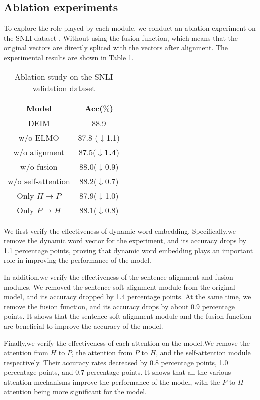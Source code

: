 \documentclass[review]{elsarticle}
\begin{document}
\subsection{ Ablation experiments}
To explore the role played by each module, we conduct an ablation experiment  on the SNLI dataset . Without using the fusion function, which means that the original vectors are directly spliced with the vectors after alignment. The experimental results are shown in Table \ref{tab:7}.
\begin{table}
 \centering
  \caption{\label{tab:7}Ablation study  on the SNLI validation dataset}
\begin{tabular}{cc}
 \toprule
Model & Acc($\%$)\\
 \midrule
DEIM & 88.9 \\
w/o ELMO & 87.8 ($\downarrow $1.1)\\
w/o alignment & 87.5(\textbf{$\downarrow $1.4}) \\
w/o fusion & 88.0($\downarrow $0.9) \\
w/o self-attention & 88.2($\downarrow $0.7) \\
Only $H\to P$ & 87.9($\downarrow $1.0) \\
Only $P\to H$ & 88.1($\downarrow $0.8) \\
\bottomrule
 \end{tabular}
\end{table}
We first verify the effectiveness of dynamic word embedding. Specifically,we remove the dynamic word vector for the experiment, and its accuracy drops by 1.1 percentage points, proving that dynamic word embedding plays an important role in improving the performance of the model.

In addition,we verify the effectiveness of the sentence alignment and fusion modules. We removed the sentence soft alignment module from the original model, and its accuracy dropped by 1.4 percentage points. At the same time, we remove the fusion function, and its accuracy drops by about 0.9 percentage points. It shows that the sentence soft alignment module and the fusion function are beneficial to improve the accuracy of the model.

Finally,we verify the effectiveness of each attention on the model.We remove the attention from $H$ to $P$, the attention from $P$ to $H$, and the self-attention module respectively. Their accuracy rates decreased by 0.8 percentage points, 1.0 percentage points, and 0.7 percentage points. It shows that all the various attention mechanisms improve the performance of the model, with the $P$ to $H$ attention being more significant for the model.
\end{document}
